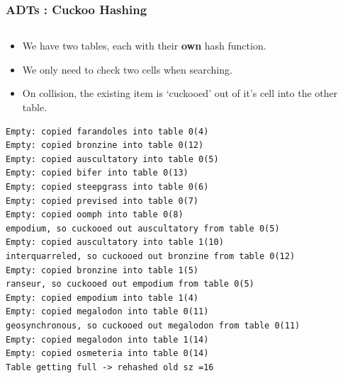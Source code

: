 \begin{frame}[fragile]
\frametitle{ADTs : Cuckoo Hashing}
\begin{columns}[T]

\begin{column}{0.45\textwidth}
\begin{itemize}[<+->]
\item We have two tables, each with their {\bf own} hash function.
\item We only need to check two cells when searching.
\item On collision, the existing item is `cuckooed' out of it's cell into the other table.
\end{itemize}
{\tiny
\begin{verbatim}
Empty: copied farandoles into table 0(4)
Empty: copied bronzine into table 0(12)
Empty: copied auscultatory into table 0(5)
Empty: copied bifer into table 0(13)
Empty: copied steepgrass into table 0(6)
Empty: copied prevised into table 0(7)
Empty: copied oomph into table 0(8)
empodium, so cuckooed out auscultatory from table 0(5)
Empty: copied auscultatory into table 1(10)
interquarreled, so cuckooed out bronzine from table 0(12)
Empty: copied bronzine into table 1(5)
ranseur, so cuckooed out empodium from table 0(5)
Empty: copied empodium into table 1(4)
Empty: copied megalodon into table 0(11)
geosynchronous, so cuckooed out megalodon from table 0(11)
Empty: copied megalodon into table 1(14)
Empty: copied osmeteria into table 0(14)
Table getting full -> rehashed old sz =16
\end{verbatim}
}
\end{column}


\end{columns}
\end{frame}
